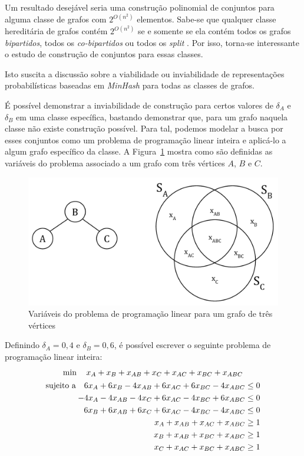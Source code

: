 Um resultado desejável seria uma construção polinomial de conjuntos para alguma classe de grafos com $2^{O(n^2)}$ elementos. Sabe-se que qualquer classe hereditária de grafos contém $2^{O(n^2)}$ se e somente se ela contém todos os grafos \emph{bipartidos}, todos os \emph{co-bipartidos} ou todos os \emph{split} \cite{spinrad2003efficient}. Por isso, torna-se interessante o estudo de construção de conjuntos para essas classes.

Isto suscita a discussão sobre a viabilidade ou inviabilidade de representações probabilísticas baseadas em \emph{MinHash} para todas as classes de grafos.

É possível demonstrar a inviabilidade de construção para certos valores de $\delta_A$ e $\delta_B$ em uma classe específica, bastando demonstrar que, para um grafo naquela classe não existe construção possível. Para tal, podemos modelar a busca por esses conjuntos como um problema de programação linear inteira e aplicá-lo a algum grafo específico da classe. A Figura~\ref{fig:graphs_mhprove} mostra como são definidas as variáveis do problema associado a um grafo com três vértices $A$, $B$ e $C$.

\begin{figure}[!htbp]
  \centering
  \includegraphics[scale=0.5]{figures/graphs_mhprove.pdf}
  \caption{Variáveis do problema de programação linear para um grafo de três vértices}
  \label{fig:graphs_mhprove}
\end{figure}

Definindo $\delta_A = 0,4$  e $\delta_B = 0,6$, é possível escrever o seguinte problema de programação linear inteira:
\begin{gather*}
\min \quad x_{A} + x_{B} + x_{AB} + x_{C} + x_{AC} + x_{BC} + x_{ABC} \\
\begin{aligned}
\textup{sujeito a} \quad 
6x_{A} + 6x_{B} - 4x_{AB} + 6x_{AC} + 6x_{BC} - 4x_{ABC} \leq 0 \\
-4x_{A} - 4x_{AB} - 4x_{C} + 6x_{AC} - 4x_{BC} + 6x_{ABC} \leq 0 \\
6x_{B} + 6x_{AB} + 6x_{C} + 6x_{AC} - 4x_{BC} - 4x_{ABC} \leq 0 \\
x_{A} + x_{AB} + x_{AC} + x_{ABC} \geq 1 \\
x_{B} + x_{AB} + x_{BC} + x_{ABC} \geq 1 \\
x_{C} + x_{AC} + x_{BC} + x_{ABC} \geq 1 \\
\end{aligned}
\end{gather*}

